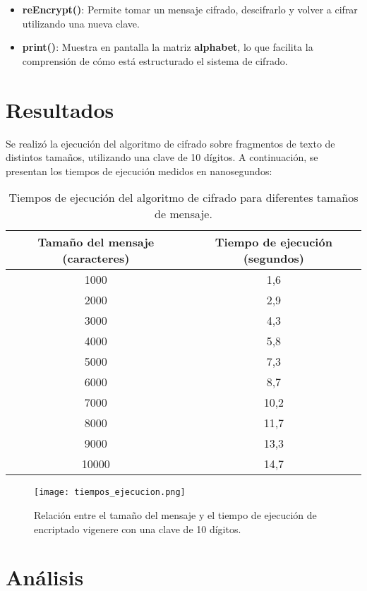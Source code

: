\documentclass[12pt]{article}
\begin{document}
\begin{itemize}
    \item \textbf{reEncrypt()}: Permite tomar un mensaje cifrado, descifrarlo y volver a cifrar utilizando una nueva clave.

    \item \textbf{print()}: Muestra en pantalla la matriz \textbf{alphabet}, lo que facilita la comprensión de cómo está estructurado el sistema de cifrado.
\end{itemize}


\section{Resultados}

Se realizó la ejecución del algoritmo de cifrado sobre fragmentos de texto de distintos tamaños, utilizando una clave de 10 dígitos. A continuación, se presentan los tiempos de ejecución medidos en nanosegundos:

\begin{table}[H]
\centering
\begin{tabular}{|c|c|}
\hline
\textbf{Tamaño del mensaje (caracteres)} & \textbf{Tiempo de ejecución (segundos)} \\
\hline
1000   & 1,6 \\
2000   & 2,9 \\
3000   & 4,3\\
4000   & 5,8 \\
5000   & 7,3 \\
6000   & 8,7 \\
7000   & 10,2 \\
8000   & 11,7 \\
9000   & 13,3 \\
10000  & 14,7 \\
\hline
\end{tabular}
\caption{\small{Tiempos de ejecución del algoritmo de cifrado para diferentes tamaños de mensaje.}}
\end{table}

\begin{figure}[H]
    \centering
    \texttt{[image: tiempos\_ejecucion.png]}
    \caption{\small{Relación entre el tamaño del mensaje y el tiempo de ejecución de encriptado vigenere con una clave de 10 dígitos.}}
\end{figure}
\section{Análisis}
\end{document}
